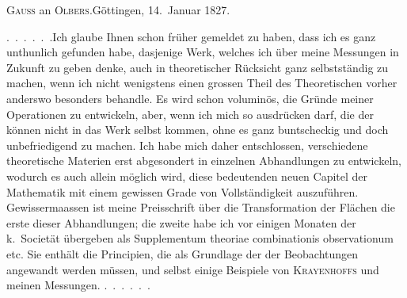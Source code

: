 \begin{center}
\textsc{Gauss} an \textsc{Olbers}.\quad Göttingen, 14.~Januar 1827.
\end{center}

\par\noindent\hspace*{\parindent}\mbox{.\ .\ .\ .\ .\ .}\quad Ich glaube Ihnen schon früher gemeldet zu haben, dass ich es ganz unthunlich gefunden habe, dasjenige Werk, welches ich über meine Messungen in Zukunft zu geben denke, auch in theoretischer Rücksicht ganz selbstständig zu machen, wenn ich nicht wenigstens einen grossen Theil des Theoretischen vorher anderswo besonders behandle.
Es wird schon voluminös, die Gründe meiner Operationen zu entwickeln, aber, wenn ich mich so ausdrücken darf, die  der  können nicht in das Werk selbst kommen, ohne es ganz buntscheckig und doch unbefriedigend zu machen.
Ich habe mich daher entschlossen, verschiedene theoretische Materien erst abgesondert in einzelnen Abhandlungen zu entwickeln, wodurch es auch allein möglich wird, diese bedeutenden neuen Capitel der Mathematik mit einem gewissen Grade von Vollständigkeit auszuführen.
Gewissermaassen ist meine Preisschrift über die Transformation der Flächen die erste dieser Abhandlungen; die zweite habe ich vor einigen Monaten der k.\ Societät übergeben als Supplementum theoriae combinationis observationum etc.
Sie enthält die Principien, die als Grundlage der  der Beobachtungen angewandt werden müssen, und selbst einige Beispiele von \textsc{Krayenhoffs} und meinen Messungen.\newline
\mbox{.\ .\ .\ .\ .\ .}\par
